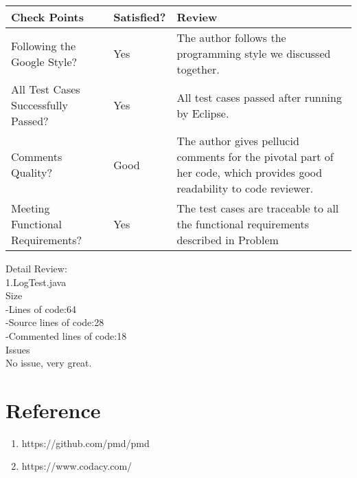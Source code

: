 \documentclass{article}
\begin{document}
\begin{center}
\begin{tabular}{|l|l|p{4cm}|}
\hline
Check Points & Satisfied? & Review \\ 
\hline
Following the Google Style? & Yes & The author follows the programming style we discussed together. \\ 
\hline
All Test Cases Successfully Passed? & Yes &All test cases passed after running by Eclipse. \\
\hline
Comments Quality? & Good & The author gives pellucid comments for the pivotal part of her code, which provides good readability to code reviewer. \\ 
\hline
Meeting Functional Requirements? & Yes & The test cases are traceable to all the  functional requirements described in Problem #2.\\ 
\hline
\end{tabular}
\end{center}

Detail Review:\\

1.LogTest.java\\

Size\\
-Lines of code:64\\
-Source lines of code:28\\
-Commented lines of code:18\\

Issues\\
No issue, very great.\\

\section{Reference}
\begin{enumerate}
\item https://github.com/pmd/pmd
\item https://www.codacy.com/\\
\end{enumerate}
\end{document}
